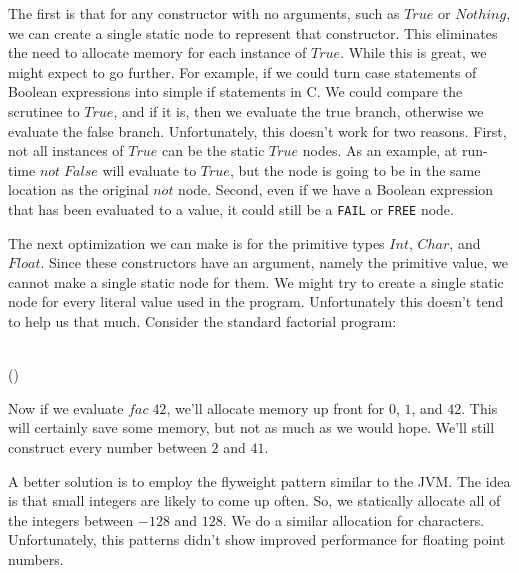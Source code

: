 \documentclass{book}
\theoremstyle{definition}
\newcommand{\Conid}[1]{\mathit{#1}}
\newcommand{\Varid}[1]{\mathit{#1}}
\def\resethooks{%
  \global\let\SaveRestoreHook\empty
  \global\let\ColumnHook\empty}
\let\hspre\empty
\let\hspost\empty
\begin{document}
The first is that for any constructor with no arguments, such as \ensuremath{\Conid{True}} or \ensuremath{\Conid{Nothing}},
we can create a single static node to represent that constructor.
This eliminates the need to allocate memory for each instance of \ensuremath{\Conid{True}}.
While this is great, we might expect to go further.
For example, if we could turn case statements of Boolean expressions into
simple if statements in C.
We could compare the scrutinee to \ensuremath{\Conid{True}}, and if it is, then we evaluate the true branch,
otherwise we evaluate the false branch.
Unfortunately, this doesn't work for two reasons.
First, not all instances of \ensuremath{\Conid{True}} can be the static \ensuremath{\Conid{True}} nodes.
As an example, at run-time \ensuremath{\Varid{not}\;\Conid{False}} will evaluate to \ensuremath{\Conid{True}},
but the node is going to be in the same location as the original \ensuremath{\Varid{not}} node.
Second, even if we have a Boolean expression that has been evaluated to a value,
it could still be a \texttt{FAIL} or \texttt{FREE} node.

The next optimization we can make is for the primitive types \ensuremath{\Conid{Int}}, \ensuremath{\Conid{Char}}, and \ensuremath{\Conid{Float}}.
Since these constructors have an argument, namely the primitive value,
we cannot make a single static node for them.
We might try to create a single static node for every literal value used in the program.
Unfortunately this doesn't tend to help us that much.
Consider the standard factorial program:
\begin{hscode}\SaveRestoreHook
\column{B}{@{}>{\hspre}l<{\hspost}@{}}%
\column{3}{@{}>{\hspre}l<{\hspost}@{}}%
\column{E}{@{}>{\hspre}l<{\hspost}@{}}%
\>[3]{}\Varid{fac}\;\mathrel{=}\<[E]%
\\
\>[3]{}\Varid{fac}\;\Varid{n}\mathrel{=}\Varid{n}\mathbin{*}\Varid{fac}\;(\Varid{n}\mathbin{-}){}\<[E]%
\ColumnHook
\end{hscode}\resethooks
Now if we evaluate \ensuremath{\Varid{fac}\;\mathrm{42}}, we'll allocate memory up front for \ensuremath{\mathrm{0}}, \ensuremath{\mathrm{1}}, and \ensuremath{\mathrm{42}}.
This will certainly save some memory, but not as much as we would hope.
We'll still construct every number between \ensuremath{\mathrm{2}} and \ensuremath{\mathrm{41}}.

A better solution is to employ the flyweight pattern similar to the JVM.
The idea is that small integers are likely to come up often.
So, we statically allocate all of the integers between \ensuremath{\mathbin{-}\mathrm{128}} and \ensuremath{\mathrm{128}}.
We do a similar allocation for characters.
Unfortunately, this patterns didn't show improved performance for floating point numbers.
\end{document}
